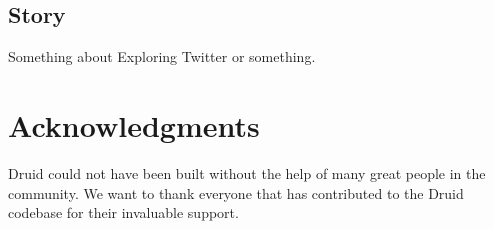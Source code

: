\documentclass{vldb}
\begin{document}
\subsection{Story}
Something about Exploring Twitter or something.

\balance

\section{Acknowledgments}
Druid could not have been built without the help of many great people in the
community.  We want to thank everyone that has contributed to the Druid
codebase for their invaluable support.


\end{document}
